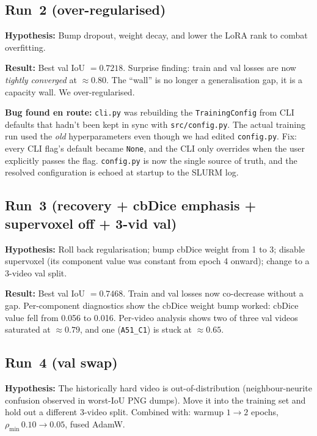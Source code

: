 \documentclass[11pt,a4paper]{article}
\begin{document}
\subsection{Run~2 (over-regularised)}

\textbf{Hypothesis:} Bump dropout, weight decay, and lower the LoRA
rank to combat overfitting.

\textbf{Result:} Best val IoU $= 0.7218$. Surprise finding: train and
val losses are now \emph{tightly converged} at $\approx 0.80$. The
``wall'' is no longer a generalisation gap, it is a capacity wall. We
over-regularised.

\textbf{Bug found en route:} \texttt{cli.py} was rebuilding the
\texttt{TrainingConfig} from CLI defaults that hadn't been kept in
sync with \texttt{src/config.py}. The actual training run used the
\emph{old} hyperparameters even though we had edited \texttt{config.py}.
Fix: every CLI flag's default became \texttt{None}, and the CLI only
overrides when the user explicitly passes the flag. \texttt{config.py}
is now the single source of truth, and the resolved configuration is
echoed at startup to the SLURM log.

\subsection{Run~3 (recovery + cbDice emphasis + supervoxel off + 3-vid val)}

\textbf{Hypothesis:} Roll back regularisation; bump cbDice weight from
1 to 3; disable supervoxel (its component value was constant from epoch
4 onward); change to a 3-video val split.

\textbf{Result:} Best val IoU $= 0.7468$. Train and val losses now
co-decrease without a gap. Per-component diagnostics show the cbDice
weight bump worked: cbDice value fell from 0.056 to 0.016. Per-video
analysis shows two of three val videos saturated at $\approx 0.79$,
and one (\texttt{A51\_C1}) is stuck at $\approx 0.65$.

\subsection{Run~4 (val swap)}

\textbf{Hypothesis:} The historically hard video is
out-of-distribution (neighbour-neurite confusion observed in
worst-IoU PNG dumps). Move it into the training set and hold out a
different 3-video split. Combined with: warmup $1 \to 2$ epochs,
$\rho_\text{min}\, 0.10 \to 0.05$, fused AdamW.
\end{document}
